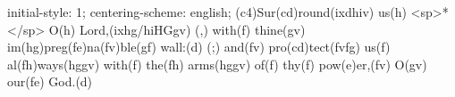 initial-style: 1;
centering-scheme: english;
(c4)Sur(cd)round(ixdhiv) us(h) <sp>*</sp> O(h) Lord,(ixhg/hiHGgv) (,) with(f) thine(gv) im(hg)preg(fe)na(fv)ble(gf) wall:(d) (;) and(fv) pro(cd)tect(fvfg) us(f) al(fh)ways(hggv) with(f) the(fh) arms(hggv) of(f) thy(f) pow(e)er,(fv) O(gv) our(fe) God.(d)
